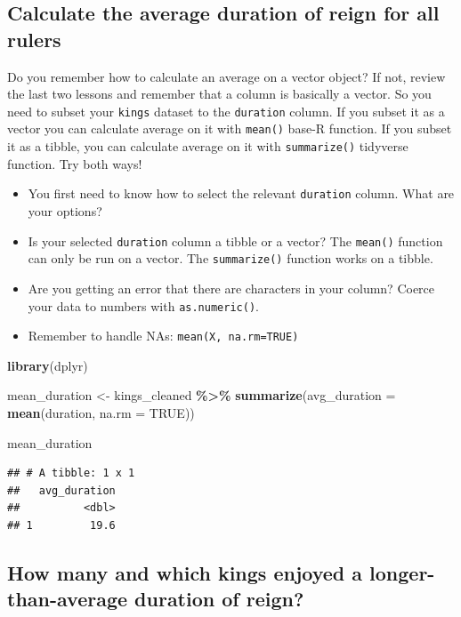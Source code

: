 \documentclass[
]{article}
\newenvironment{Shaded}{\begin{snugshade}}{\end{snugshade}}
\newcommand{\AttributeTok}[1]{\textcolor[rgb]{0.13,0.29,0.53}{#1}}
\newcommand{\ConstantTok}[1]{\textcolor[rgb]{0.56,0.35,0.01}{#1}}
\newcommand{\FunctionTok}[1]{\textcolor[rgb]{0.13,0.29,0.53}{\textbf{#1}}}
\newcommand{\NormalTok}[1]{#1}
\newcommand{\OtherTok}[1]{\textcolor[rgb]{0.56,0.35,0.01}{#1}}
\newcommand{\SpecialCharTok}[1]{\textcolor[rgb]{0.81,0.36,0.00}{\textbf{#1}}}
\providecommand{\tightlist}{%
  \setlength{\itemsep}{0pt}\setlength{\parskip}{0pt}}
\begin{document}
\subsection{Calculate the average duration of reign for all
rulers}\label{calculate-the-average-duration-of-reign-for-all-rulers}

Do you remember how to calculate an average on a vector object? If not,
review the last two lessons and remember that a column is basically a
vector. So you need to subset your \texttt{kings} dataset to the
\texttt{duration} column. If you subset it as a vector you can calculate
average on it with \texttt{mean()} base-R function. If you subset it as
a tibble, you can calculate average on it with \texttt{summarize()}
tidyverse function. Try both ways!

\begin{itemize}
\tightlist
\item
  You first need to know how to select the relevant \texttt{duration}
  column. What are your options?
\item
  Is your selected \texttt{duration} column a tibble or a vector? The
  \texttt{mean()} function can only be run on a vector. The
  \texttt{summarize()} function works on a tibble.
\item
  Are you getting an error that there are characters in your column?
  Coerce your data to numbers with \texttt{as.numeric()}.
\item
  Remember to handle NAs: \texttt{mean(X,\ na.rm=TRUE)}
\end{itemize}

\begin{Shaded}
\begin{Highlighting}[]
\FunctionTok{library}\NormalTok{(dplyr)}

\NormalTok{mean\_duration }\OtherTok{\textless{}{-}}\NormalTok{ kings\_cleaned }\SpecialCharTok{\%\textgreater{}\%}
  \FunctionTok{summarize}\NormalTok{(}\AttributeTok{avg\_duration =} \FunctionTok{mean}\NormalTok{(duration, }\AttributeTok{na.rm =} \ConstantTok{TRUE}\NormalTok{))}

\NormalTok{mean\_duration}
\end{Highlighting}
\end{Shaded}

\begin{verbatim}
## # A tibble: 1 x 1
##   avg_duration
##          <dbl>
## 1         19.6
\end{verbatim}

\subsection{How many and which kings enjoyed a longer-than-average
duration of
reign?}\label{how-many-and-which-kings-enjoyed-a-longer-than-average-duration-of-reign}
\end{document}
